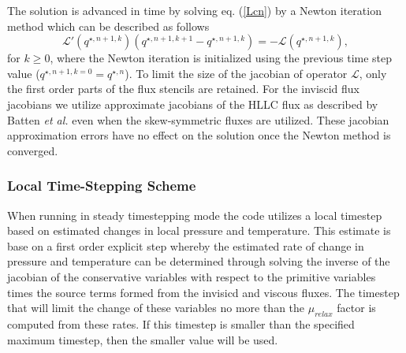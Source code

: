 The solution is advanced in time by solving eq. (\ref{Lcn}) by a
Newton iteration method which can be described as follows
\begin{equation}
\mathcal{L}'(q^{\star, n+1,k}) (q^{\star,n+1,k+1} - q^{\star, n+1,k}) = -\mathcal{L}
(q^{\star,n+1,k}), \label{new}
\end{equation}
for $k\geq 0$, where the Newton iteration is initialized using the
previous time step value ($q^{\star,n+1,k=0} = q^{\star,n}$). To limit
the size of the jacobian of operator $\mathcal{L}$, only the first
order parts of the flux stencils are retained.  For the inviscid flux
jacobians we utilize approximate jacobians of the HLLC flux as
described by Batten {\it et al.} \cite{Batten.2006} even when the
skew-symmetric fluxes are utilized. These jacobian approximation
errors have no effect on the solution once the Newton method is
converged.



\subsubsection{Local Time-Stepping Scheme}

When running in steady timestepping mode the code utilizes a local
timestep based on estimated changes in local pressure and temperature.
This estimate is base on a first order explicit step whereby the
estimated rate of change in pressure and temperature can be determined
through solving the inverse of the jacobian of the conservative
variables with respect to the primitive variables times the source
terms formed from the invisicd and viscous fluxes.  The timestep that
will limit the change of these variables no more than the
$\mu_{relax}$ factor is computed from these rates.  If this timestep
is smaller than the specified maximum timestep, then the smaller value
will be used.
